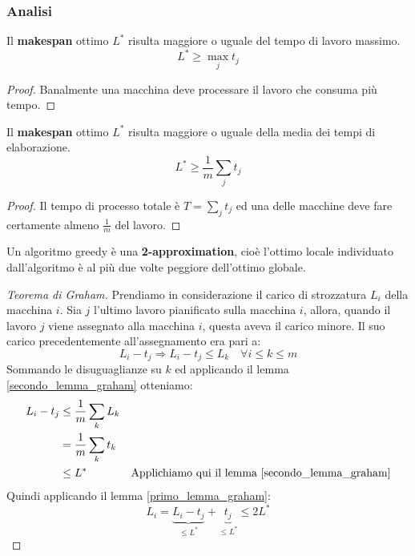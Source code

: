 \documentclass[\main/main.tex]{subfiles}
\begin{document}
\subsubsection{Analisi}
\begin{lemma}
  Il \textbf{makespan} ottimo \(L^*\) risulta maggiore o uguale del tempo di lavoro massimo.
  \[
    L^* \geq \max_{j} t_j
  \]
  \label{primo_lemma_graham}
\end{lemma}
\begin{proof}
  Banalmente una macchina deve processare il lavoro che consuma più tempo.
\end{proof}
\begin{lemma}
  Il  \textbf{makespan} ottimo \(L^*\) risulta maggiore o uguale della media dei tempi di elaborazione.
  \[
    L^* \geq \frac{1}{m} \sum_{j} t_j
  \]
  \label{secondo_lemma_graham}
\end{lemma}
\begin{proof}
  Il tempo di processo totale è \(T = \sum_{j} t_j\) ed una delle macchine deve fare certamente almeno \(\frac{1}{m}\) del lavoro.
\end{proof}
\begin{theorem}
  Un algoritmo greedy è una \textbf{2-approximation}, cioè l'ottimo locale individuato dall'algoritmo è al più due volte peggiore dell'ottimo globale.
  \label{graham_theorem}
\end{theorem}
\begin{proof}[Teorema di Graham]
  Prendiamo in considerazione il carico di strozzatura \(L_i\) della macchina \(i\). Sia \(j\) l'ultimo lavoro pianificato sulla macchina \(i\), allora, quando il lavoro \(j\) viene assegnato alla macchina \(i\), questa aveva il carico minore. Il suo carico precedentemente all'assegnamento era pari a:
  \[
    L_i - t_j \Rightarrow L_i - t_j \leq L_k \quad \forall i \leq k \leq m
  \]
  Sommando le disuguaglianze su \(k\) ed applicando il lemma \ref{secondo_lemma_graham} otteniamo:
  \begin{align*}
    L_i - t_j & \leq \frac{1}{m} \sum_{k} L_k &                                                            \\
              & = \frac{1}{m} \sum_{k} t_k    &                                                            \\
              & \leq L^*                      & \text{Applichiamo qui il lemma \ref{secondo_lemma_graham}} \\
  \end{align*}
  Quindi applicando il lemma \ref{primo_lemma_graham}:
  \[
    L_i = \underbrace{L_i - t_j}_{\leq L^*} + \underbrace{t_j}_{\leq L^*} \leq 2L^*
  \]
\end{proof}
\end{document}
